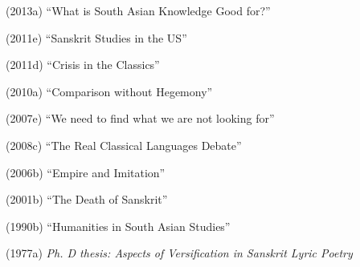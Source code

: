 (2013a) “What is South Asian Knowledge Good for?”

(2011e) “Sanskrit Studies in the US”

(2011d) “Crisis in the Classics”

(2010a) “Comparison without Hegemony”

(2007e) “We need to find what we are not looking for”

(2008c) “The Real Classical Languages Debate”

(2006b) “Empire and Imitation”

(2001b) “The Death of Sanskrit”

(1990b) “Humanities in South Asian Studies”

(1977a) \textit{Ph. D thesis: Aspects of Versification in Sanskrit Lyric Poetry}

